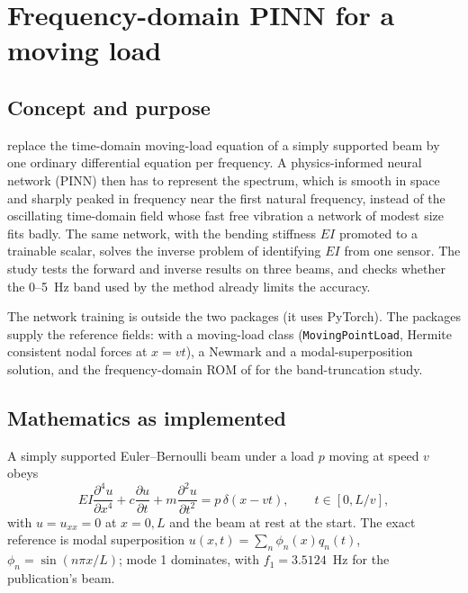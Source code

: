\section{Frequency-domain PINN for a moving load}\label{sec:vf-fdpinn}

\subsection*{Concept and purpose}

\citet{liang2024fdpinn} replace the time-domain moving-load equation of a simply supported beam by one ordinary differential equation per frequency. A physics-informed neural network (PINN) then has to represent the spectrum, which is smooth in space and sharply peaked in frequency near the first natural frequency, instead of the oscillating time-domain field whose fast free vibration a network of modest size fits badly. The same network, with the bending stiffness $EI$ promoted to a trainable scalar, solves the inverse problem of identifying $EI$ from one sensor. The study tests the forward and inverse results on three beams, and checks whether the 0--5~Hz band used by the method already limits the accuracy.

The network training is outside the two packages (it uses PyTorch). The packages supply the reference fields: \fea{} with a moving-load class (\texttt{MovingPointLoad}, Hermite consistent nodal forces at $x=vt$), a Newmark and a modal-superposition solution, and the frequency-domain ROM of \rom{} for the band-truncation study.

\subsection*{Mathematics as implemented}

A simply supported Euler--Bernoulli beam under a load $p$ moving at speed $v$ obeys
\begin{equation}\label{eq:fd-pde}
EI\frac{\partial^4u}{\partial x^4}+c\frac{\partial u}{\partial t}+m\frac{\partial^2u}{\partial t^2}=p\,\delta(x-vt),\qquad t\in[0,L/v],
\end{equation}
with $u=u_{xx}=0$ at $x=0,L$ and the beam at rest at the start. The exact reference is modal superposition $u(x,t)=\sum_n\phi_n(x)q_n(t)$, $\phi_n=\sin(n\pi x/L)$; mode 1 dominates, with $f_1=3.5124$~Hz for the publication's beam.

